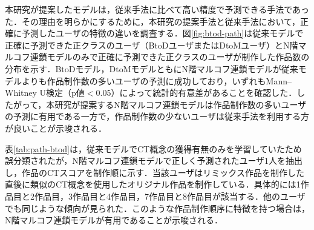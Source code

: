\documentclass[submit]{ipsj}
\begin{document}
本研究が提案したモデルは，従来手法に比べて高い精度で予測できる手法であった．その理由を明らかにするために，本研究の提案手法と従来手法において，正確に予測したユーザの特徴の違いを調査する．図\ref{fig:btod-path}は従来モデルで正確に予測できた正クラスのユーザ（BtoDユーザまたはDtoMユーザ）とN階マルコフ連鎖モデルのみで正確に予測できた正クラスのユーザが制作した作品数の分布を示す．BtoDモデル，DtoMモデルともにN階マルコフ連鎖モデルが従来モデルよりも作品制作数の多いユーザの予測に成功しており，いずれもMann–Whitney U検定（p値$<$0.05）によって統計的有意差があることを確認した．したがって，本研究が提案するN階マルコフ連鎖モデルは作品制作数の多いユーザの予測に有用である一方で，作品制作数の少ないユーザは従来手法を利用する方が良いことが示唆される．

表\ref{tab:path-btod}は，従来モデルでCT概念の獲得有無のみを学習していたため誤分類されたが，N階マルコフ連鎖モデルで正しく予測されたユーザ1人を抽出し，作品のCTスコアを制作順に示す．当該ユーザはリミックス作品を制作した直後に類似のCT概念を使用したオリジナル作品を制作している．具体的には1作品目と2作品目，3作品目と4作品目，7作品目と8作品目が該当する．他のユーザでも同じような傾向が見られた．このような作品制作順序に特徴を持つ場合は，N階マルコフ連鎖モデルが有用であることが示唆される．



\end{document}
